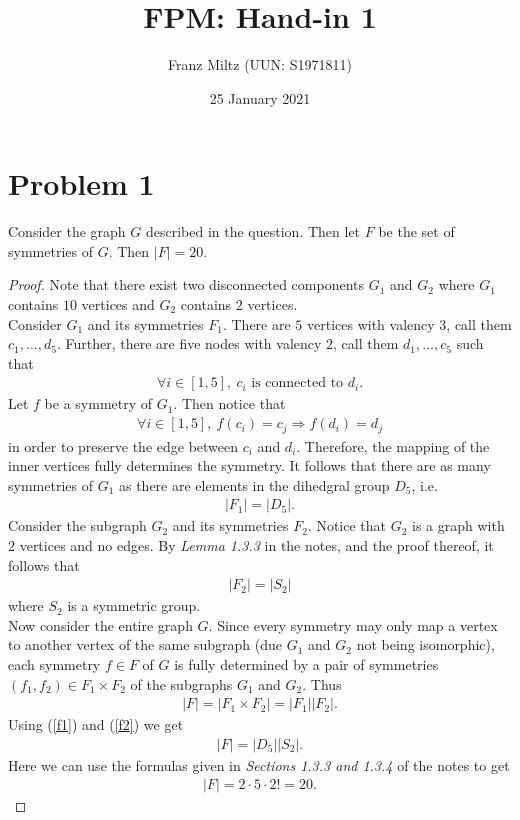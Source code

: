 \documentclass{article}
\begin{document}
\title{FPM: Hand-in 1}
\author{Franz Miltz (UUN: S1971811)}
\date{25 January 2021}
\maketitle

\section*{Problem 1}
\begin{claim}
	Consider the graph $G$ described in the question. Then
	let $F$ be the set of symmetries of $G$. Then $|F|=20$.
\end{claim}
\begin{proof}
	Note that there exist two disconnected components
	$G_1$ and $G_2$ where $G_1$ contains $10$ vertices
	and $G_2$ contains $2$ vertices. \\
	Consider $G_1$ and its symmetries $F_1$. There are $5$ vertices with valency
	$3$, call them $c_1, ..., d_5$. Further, there are
	five nodes with valency $2$, call them $d_1, ..., c_5$
	such that
	\begin{align*}
		\forall i\in[1,5],\: c_i \text{ is connected to } d_i.
	\end{align*}
	Let $f$ be a symmetry of $G_1$. Then notice that
	\begin{align*}
		\forall i\in[1,5],\: f(c_i)=c_j \Rightarrow f(d_i)=d_j
	\end{align*}
	in order to preserve the edge between $c_i$ and $d_i$.
	Therefore, the mapping of the inner vertices fully
	determines the symmetry. It follows that there are as
	many symmetries of $G_1$ as there are elements in the
	dihedgral group $D_5$, i.e.
	\begin{align}
		\label{f1}
		|F_1|=|D_5|.
	\end{align}
	Consider the subgraph $G_2$ and its symmetries $F_2$.
	Notice that $G_2$ is a graph with $2$ vertices and
	no edges. By \emph{Lemma 1.3.3} in the notes, and the
	proof thereof, it follows that
	\begin{align}
		\label{f2}
		|F_2|=|S_2|
	\end{align}
	where $S_2$ is a symmetric group.\\
	Now consider the entire graph $G$. Since every symmetry may
	only map a vertex to another vertex of the same subgraph
	(due $G_1$ and $G_2$ not being isomorphic),
	each symmetry $f\in F$ of $G$ is fully determined by
	a pair of symmetries $(f_1, f_2)\in F_1\times F_2$ of
	the subgraphs $G_1$ and $G_2$. Thus
	\begin{align*}
		|F| = |F_1\times F_2| = |F_1||F_2|.
	\end{align*}
	Using (\ref{f1}) and (\ref{f2}) we get
	\begin{align*}
		|F| = |D_5||S_2|.
	\end{align*}
	Here we can use the formulas given in \emph{Sections 1.3.3
		and 1.3.4} of the notes to get
	\begin{align*}
		|F| = 2\cdot 5\cdot 2! = 20.
	\end{align*}
\end{proof}
\end{document}
